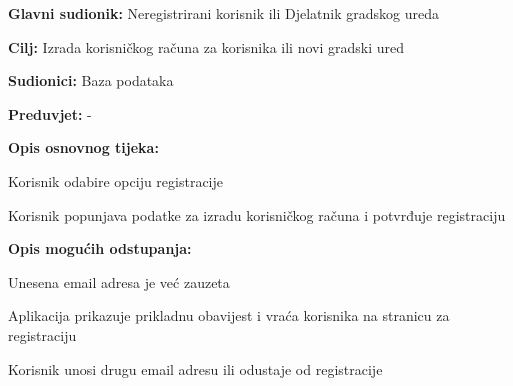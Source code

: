 				
				\noindent {}
				\begin{packed_item}
					
					\item \textbf{Glavni sudionik:} Neregistrirani korisnik ili Djelatnik gradskog ureda
					\item  \textbf{Cilj:} Izrada korisničkog računa za korisnika ili novi gradski ured
					\item  \textbf{Sudionici:} Baza podataka
					\item  \textbf{Preduvjet:} -
					
					\item  \textbf{Opis osnovnog tijeka:}
					\item[] \begin{packed_enum}
						\item Korisnik odabire opciju registracije
						\item Korisnik popunjava podatke za izradu korisničkog računa i potvrđuje registraciju
					\end{packed_enum}
					
					\item  \textbf{Opis mogućih odstupanja:}
					\item[] \begin{packed_item}
						\item[2.a] Unesena email adresa je već zauzeta
						\item[] \begin{packed_enum}
							\item Aplikacija prikazuje prikladnu obavijest i vraća korisnika na stranicu za registraciju
							\item Korisnik unosi drugu email adresu ili odustaje od registracije
						\end{packed_enum}
					\end{packed_item}
				\end{packed_item}
				

